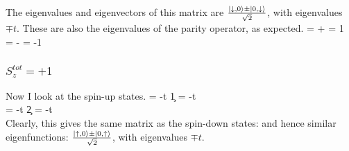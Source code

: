 \documentclass{article}
\begin{document}
The eigenvalues and eigenvectors of this matrix are \(\frac{\ket{\downarrow,0} \pm \ket{0,\downarrow}}{\sqrt{2}}\), with eigenvalues \(\mp t\). These are also the eigenvalues of the parity operator, as expected.
\beq
{} =  +  \implies {} = 1 \\
 =  -  \implies {} = -1
\eeq
\subsubsection{\(S_z^{tot} = +1\)}
Now I look at the spin-up states.
\beq
\ham{} = -t \c{1}{\uparrow} = -t \\
\ham{} = -t \c{2}{\uparrow} = -t \\
\eeq
Clearly, this gives the same matrix as the spin-down states:
\beq
{}
\eeq
and hence similar eigenfunctions: \(\frac{\ket{\uparrow,0} \pm \ket{0,\uparrow}}{\sqrt{2}}\), with eigenvalues \(\mp t\).
\end{document}
